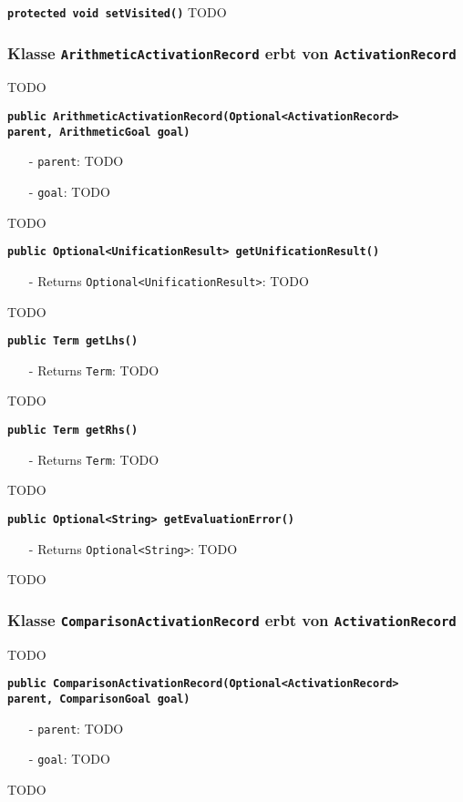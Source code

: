 \documentclass[parskip=full,11pt,twoside]{scrartcl}
\begin{document}
\textbf{\texttt{protected void setVisited()}}
TODO

\subsubsection{Klasse \texttt{ArithmeticActivationRecord} erbt von \texttt{ActivationRecord}}
TODO

\textbf{\texttt{public ArithmeticActivationRecord(Optional<ActivationRecord>\\parent, ArithmeticGoal goal)}}
\begin{itemize}[noitemsep]
	\item[-] \texttt{parent}: TODO
	\item[-] \texttt{goal}: TODO
\end{itemize}
TODO

\textbf{\texttt{public Optional<UnificationResult> getUnificationResult()}}
\begin{itemize}[noitemsep]
	\item[-] Returns \texttt{Optional<UnificationResult>}: TODO
\end{itemize}
TODO

\textbf{\texttt{public Term getLhs()}}
\begin{itemize}[noitemsep]
	\item[-] Returns \texttt{Term}: TODO
\end{itemize}
TODO

\textbf{\texttt{public Term getRhs()}}
\begin{itemize}[noitemsep]
	\item[-] Returns \texttt{Term}: TODO
\end{itemize}
TODO

\textbf{\texttt{public Optional<String> getEvaluationError()}}
\begin{itemize}[noitemsep]
	\item[-] Returns \texttt{Optional<String>}: TODO
\end{itemize}
TODO

\subsubsection{Klasse \texttt{ComparisonActivationRecord} erbt von \texttt{ActivationRecord}}
TODO

\textbf{\texttt{public ComparisonActivationRecord(Optional<ActivationRecord>\\ parent, ComparisonGoal goal)}}
\begin{itemize}[noitemsep]
	\item[-] \texttt{parent}: TODO
	\item[-] \texttt{goal}: TODO
\end{itemize}
TODO
\end{document}
